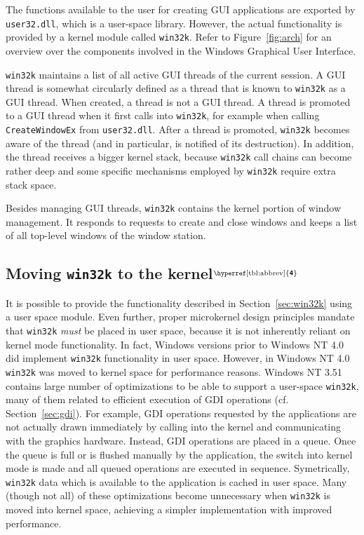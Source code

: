 \documentclass[10pt,twocolumn,a4paper]{article}
\newcommand{\bs}[1]{\textbf{\sffamily #1}}
\newcommand{\winver}[1]{$^{\text{\hyperref[tbl:abbrev]{\bs{#1}}}}$}
\newcommand{\winsubsection}[2]{\subsection[#1]{#1\winver{#2}}}
\begin{document}
		The functions available to the user for creating GUI applications are
		exported by \texttt{user32.dll}, which is a user-space library.
		However, the actual functionality is provided by a kernel module called
		\texttt{win32k}. Refer to Figure~\ref{fig:arch} for an overview over the
		components involved in the Windows Graphical User Interface. \cite{probertwin32k}

		\texttt{win32k} maintains a list of all active GUI threads of the
		current session. A GUI thread is somewhat circularly defined as a
		thread that is known to \texttt{win32k} as a GUI thread. When created,
		a thread is not a GUI thread. A thread is promoted to a GUI thread when
		it first calls into \texttt{win32k}, for example when calling
		\texttt{CreateWindowEx} from \texttt{user32.dll}. After a thread is
		promoted, \texttt{win32k} becomes aware of the thread (and in
		particular, is notified of its destruction). In addition, the thread
		receives a bigger kernel stack, because \texttt{win32k} call chains
		can become rather deep and some specific mechanisms employed by \texttt{win32k}
		require extra stack space.
		\cite{probertwin32k,mandy2011kernel}

		Besides managing GUI threads, \texttt{win32k} contains the kernel portion
		of window management. It responds to requests to create and close windows
		and keeps a list of all top-level windows of the window station.
		\cite{probertwin32k,goingdeep}

		\winsubsection{Moving \texttt{win32k} to the kernel}{4}
			It is possible to provide the functionality described in Section~\ref{sec:win32k}
			using a user space module. Even further, proper microkernel design principles
			mandate that \texttt{win32k} \emph{must} be placed in user space, because
			it is not inherently reliant on kernel mode functionality.
			In fact, Windows versions prior to Windows NT 4.0
			did implement \texttt{win32k} functionality in user space. However,
			in Windows NT 4.0 \texttt{win32k} was moved to kernel space for
			performance reasons. Windows NT 3.51 contains large number of optimizations
			to be able to support a user-space \texttt{win32k}, many of them related
			to efficient execution of GDI operations (cf. Section~\ref{sec:gdi}).
			For example, GDI operations requested by the applications are not
			actually drawn immediately by calling into the kernel and communicating
			with the graphics hardware. Instead, GDI operations are placed in a
			queue. Once the queue is full or is flushed manually by the application,
			the switch into kernel mode is made and all queued operations are executed
			in sequence. Symetrically, \texttt{win32k} data which is available to the application
			is cached in user space.
			Many (though not all) of these optimizations become unnecessary when
			\texttt{win32k} is moved into kernel space, achieving a simpler implementation
			with improved performance.
			\cite{gdikernel}
\end{document}
